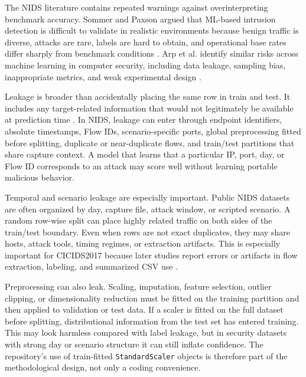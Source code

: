The NIDS literature contains repeated warnings against overinterpreting benchmark accuracy. Sommer and Paxson argued that ML-based intrusion detection is difficult to validate in realistic environments because benign traffic is diverse, attacks are rare, labels are hard to obtain, and operational base rates differ sharply from benchmark conditions \parencite{SommerPaxson2010ClosedWorld}. Arp et al. identify similar risks across machine learning in computer security, including data leakage, sampling bias, inappropriate metrics, and weak experimental design \parencite{Arp2020DosDontsMLSecurity}.

Leakage is broader than accidentally placing the same row in train and test. It includes any target-related information that would not legitimately be available at prediction time \parencite{Kaufman2011LeakageDataMining}. In NIDS, leakage can enter through endpoint identifiers, absolute timestamps, Flow IDs, scenario-specific ports, global preprocessing fitted before splitting, duplicate or near-duplicate flows, and train/test partitions that share capture context. A model that learns that a particular IP, port, day, or Flow ID corresponds to an attack may score well without learning portable malicious behavior.

Temporal and scenario leakage are especially important. Public NIDS datasets are often organized by day, capture file, attack window, or scripted scenario. A random row-wise split can place highly related traffic on both sides of the train/test boundary. Even when rows are not exact duplicates, they may share hosts, attack tools, timing regimes, or extraction artifacts. This is especially important for CICIDS2017 because later studies report errors or artifacts in flow extraction, labeling, and summarized CSV use \parencite{Engelen2021CICIDSIssues,Lanvin2023Errors,Liu2022ErrorPrevalenceNIDS,Rosay2022CICIDS2017Analysis,Dube2024FaultyCICIDS2017}.

Preprocessing can also leak. Scaling, imputation, feature selection, outlier clipping, or dimensionality reduction must be fitted on the training partition and then applied to validation or test data. If a scaler is fitted on the full dataset before splitting, distributional information from the test set has entered training. This may look harmless compared with label leakage, but in security datasets with strong day or scenario structure it can still inflate confidence. The repository's use of train-fitted \texttt{StandardScaler} objects is therefore part of the methodological design, not only a coding convenience.

